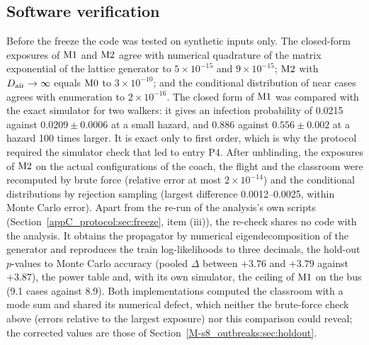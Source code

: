 \subsection{Software verification}\label{appC_protocol:sec:software}

Before the freeze the code was tested on synthetic inputs only. The closed-form exposures of $\mathrm{M1}$ and
$\mathrm{M2}$ agree with numerical quadrature of the matrix exponential of the lattice generator to
$5\times10^{-15}$ and $9\times10^{-15}$; $\mathrm{M2}$ with $D_{\mathrm{air}}\to\infty$ equals $\mathrm{M0}$ to $3\times10^{-10}$;
and the conditional distribution of near cases agrees with enumeration to $2\times10^{-16}$.
The closed form of $\mathrm{M1}$ was compared with the exact simulator for two walkers: it gives an infection
probability of 0.0215 against $0.0209\pm0.0006$ at a small hazard, and 0.886 against $0.556\pm0.002$ at a
hazard 100 times larger. It is
exact only to first order, which is why the protocol required the simulator check that led to entry P4.
After unblinding, the exposures of $\mathrm{M2}$ on the actual configurations of the coach, the flight and the
classroom were recomputed by brute force (relative error at most $2\times10^{-14}$) and the conditional
distributions by rejection sampling (largest difference 0.0012--0.0025, within Monte Carlo error).
Apart from the re-run of the analysis's own scripts (Section~\ref{appC_protocol:sec:freeze}, item (iii)), the re-check shares no code with the analysis. It obtains the propagator by numerical eigendecomposition
of the generator and reproduces the train log-likelihoods to three decimals, the hold-out $p$-values to Monte
Carlo accuracy (pooled $\Delta$ between $+3.76$ and $+3.79$ against $+3.87$), the power table and, with its
own simulator, the ceiling of $\mathrm{M1}$ on the bus (9.1 cases against 8.9). Both implementations computed the
classroom with a mode sum and shared its numerical defect, which neither the brute-force check above (errors
relative to the largest exposure) nor this comparison could reveal; the corrected values are those of
Section~\ref{M-s8_outbreaks:sec:holdout}.
